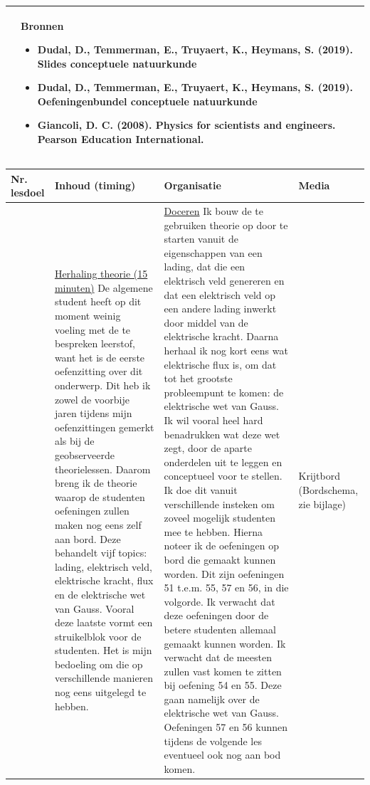 \begin{landscape}
\begin{tabularx}{1.56\textwidth}{|p{}|X|}
		\\ \cline{2-2}
		  & \textbf{Bronnen}\begin{itemize}
		  	\item Dudal, D., Temmerman, E., Truyaert, K., Heymans, S. (2019). Slides conceptuele natuurkunde
		  	\item Dudal, D., Temmerman, E., Truyaert, K., Heymans, S. (2019). Oefeningenbundel conceptuele natuurkunde
		  	\item Giancoli, D. C. (2008). Physics for scientists and engineers. Pearson Education International.
		  \end{itemize}\\ \hline
	\end{tabularx}


\newpage
	
	\begin{tabularx}{1.56\textwidth}{|p{1.5cm}|p{6cm}|X|p{4cm}|}
		\hline
		\textbf{Nr. lesdoel } & \textbf{Inhoud (timing)}  & \textbf{Organisatie } & \textbf{Media } \\ \hline
		&\underline{Herhaling theorie (15 minuten)}\newline
		De algemene student heeft op dit moment weinig voeling met de te bespreken leerstof, want het is de eerste oefenzitting over dit onderwerp. Dit heb ik zowel de voorbije jaren tijdens mijn oefenzittingen gemerkt als bij de geobserveerde theorielessen. Daarom breng ik de theorie waarop de studenten oefeningen zullen maken nog eens zelf aan bord. Deze behandelt vijf topics: lading, elektrisch veld, elektrische kracht, flux en de elektrische wet van Gauss. Vooral deze laatste vormt een struikelblok voor de studenten. Het is mijn bedoeling om die op verschillende manieren nog eens uitgelegd te hebben.
		&  \underline{Doceren}\newline 
		Ik bouw de te gebruiken theorie op door te starten vanuit de eigenschappen van een lading, dat die een elektrisch veld genereren en dat een elektrisch veld op een andere lading inwerkt door middel van de elektrische kracht. Daarna herhaal ik nog kort eens wat elektrische flux is, om dat tot het grootste probleempunt te komen: de elektrische wet van Gauss.\newline
		Ik wil vooral heel hard benadrukken wat deze wet zegt, door de aparte onderdelen uit te leggen en conceptueel voor te stellen. Ik doe dit vanuit verschillende insteken om zoveel mogelijk studenten mee te hebben. 
		\newline 
		Hierna noteer ik de oefeningen op bord die gemaakt kunnen worden. Dit zijn oefeningen 51 t.e.m. 55, 57 en 56, in die volgorde. Ik verwacht dat deze oefeningen door de betere studenten allemaal gemaakt kunnen worden. Ik verwacht dat de meesten zullen vast komen te zitten bij oefening 54 en 55. Deze gaan namelijk over de elektrische wet van Gauss. Oefeningen 57 en 56 kunnen tijdens de volgende les eventueel ook nog aan bod komen. 
		& Krijtbord (Bordschema, zie bijlage)
		\\ \hline
	\end{tabularx}


\end{landscape}
